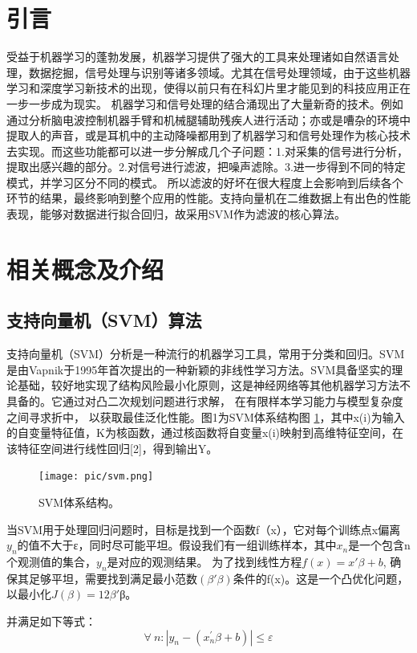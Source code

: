 \section{引言}
受益于机器学习的蓬勃发展，机器学习提供了强大的工具来处理诸如自然语言处理，数据挖掘，信号处理与识别等诸多领域。尤其在信号处理领域，由于这些机器学习和深度学习新技术的出现，使得以前只有在科幻片里才能见到的科技应用正在一步一步成为现实。
机器学习和信号处理的结合涌现出了大量新奇的技术。例如通过分析脑电波控制机器手臂和机械腿辅助残疾人进行活动；亦或是嘈杂的环境中提取人的声音，或是耳机中的主动降噪都用到了机器学习和信号处理作为核心技术去实现。而这些功能都可以进一步分解成几个子问题：1.对采集的信号进行分析，提取出感兴趣的部分。2.对信号进行滤波，把噪声滤除。3.进一步得到不同的特定模式，并学习区分不同的模式。
所以滤波的好坏在很大程度上会影响到后续各个环节的结果，最终影响到整个应用的性能。支持向量机在二维数据上有出色的性能表现，能够对数据进行拟合回归，故采用SVM作为滤波的核心算法。
\section{相关概念及介绍}
\subsection{支持向量机（SVM）算法}
支持向量机（SVM）分析是一种流行的机器学习工具，常用于分类和回归。SVM是由Vapnik于1995年首次提出的一种新颖的非线性学习方法。SVM具备坚实的理论基础，较好地实现了结构风险最小化原则，这是神经网络等其他机器学习方法不具备的。它通过对凸二次规划问题进行求解， 在有限样本学习能力与模型复杂度之间寻求折中， 以获取最佳泛化性能。图1为SVM体系结构图 \ref{fig:SVM}，其中x(i)为输入的自变量特征值，K为核函数，通过核函数将自变量x(i)映射到高维特征空间，在该特征空间进行线性回归[2]，得到输出Y。
\begin{figure}[!htbp]
    \centering
    \texttt{[image: pic/svm.png]}%
    \caption{SVM体系结构。}
    \label{fig:SVM}
\end{figure}

当SVM用于处理回归问题时，目标是找到一个函数f（x），它对每个训练点x偏离$y_n$的值不大于ε，同时尽可能平坦。假设我们有一组训练样本，其中$x_n$是一个包含n个观测值的集合，$y_n$是对应的观测结果。
为了找到线性方程$f(x)=x′β+b$, 确保其足够平坦，需要找到满足最小范数$(β′β)$条件的f(x)。这是一个凸优化问题，以最小化$J(β)=12β′$β。

并满足如下等式：
\begin{equation}
\forall\ n:\left|y_n-\left(x_n^\prime\beta+b\right)\right|\le\varepsilon
\end{equation}


